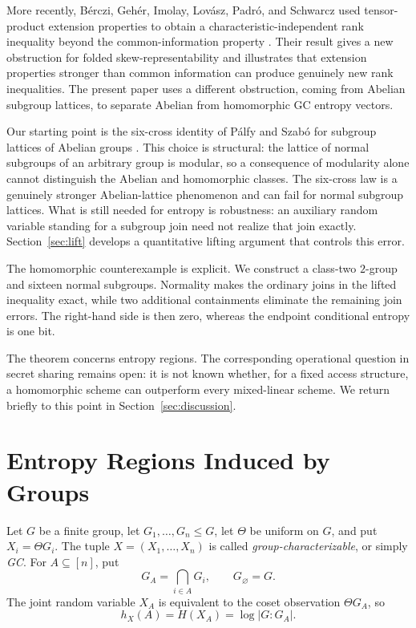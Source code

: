 \documentclass[journal]{IEEEtran}
\begin{document}
More recently, B\'erczi, Geh\'er, Imolay, Lov\'asz, Padr\'o, and Schwarcz
used tensor-product extension properties to obtain a
characteristic-independent rank inequality beyond the common-information
property \cite{BercziEtAl2026}.  Their result gives a new obstruction for folded
skew-representability and illustrates that extension properties stronger than
common information can produce genuinely new rank inequalities.  The present
paper uses a different obstruction, coming from Abelian subgroup lattices, to
separate Abelian from homomorphic GC entropy vectors.

Our starting point is the six-cross identity of P\'alfy and Szab\'o for
subgroup lattices of Abelian groups
\cite{PalfySzabo1995Congruence,PalfySzabo1995,Penttila2017}.  This choice is
structural: the lattice of normal subgroups of an arbitrary group is modular,
so a consequence of modularity alone cannot distinguish the Abelian and
homomorphic classes.  The six-cross law is a genuinely stronger Abelian-lattice
phenomenon and can fail for normal subgroup lattices.  What is still needed for
entropy is robustness: an auxiliary random variable standing for a subgroup
join need not realize that join exactly.  Section~\ref{sec:lift} develops a
quantitative lifting argument that controls this error.

The homomorphic counterexample is explicit.  We construct a class-two
$2$-group and sixteen normal subgroups.  Normality makes the ordinary joins in
the lifted inequality exact, while two additional containments eliminate the
remaining join errors.  The right-hand side is then zero, whereas the endpoint
conditional entropy is one bit.

The theorem concerns entropy regions.  The corresponding operational question
in secret sharing remains open: it is not known whether, for a fixed access
structure, a homomorphic scheme can outperform every mixed-linear scheme.  We
return briefly to this point in Section~\ref{sec:discussion}.

\section{Entropy Regions Induced by Groups}\label{sec:regions}
Let $G$ be a finite group, let $G_1,\ldots,G_n\le G$, let $\Theta$ be uniform on
$G$, and put $X_i=\Theta G_i$.  The tuple $X=(X_1,\ldots,X_n)$ is called
\emph{group-characterizable}, or simply \emph{GC}.  For $A\subseteq[n]$, put
\[
  G_A=\bigcap_{i\in A}G_i,\qquad G_\varnothing=G.
\]
The joint random variable $X_A$ is equivalent to the coset observation $\Theta G_A$,
so
\begin{equation}\label{eq:gc-entropy}
  h_X(A)=H(X_A)=\log|G:G_A|.
\end{equation}
\end{document}
